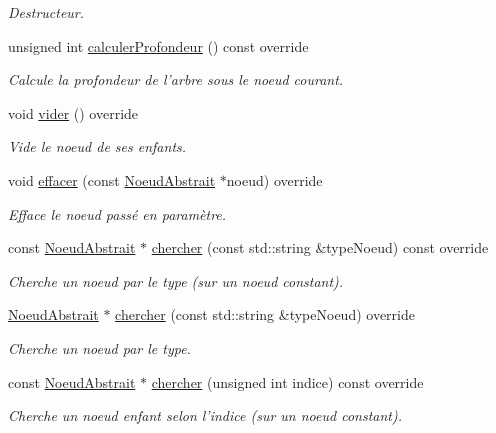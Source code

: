 \begin{DoxyCompactItemize}
\begin{DoxyCompactList}\small\item\em Destructeur. \end{DoxyCompactList}\item 
unsigned int \hyperlink{group__inf2990_ga89492965d116a0ff989ad93114acda57}{calculer\-Profondeur} () const override
\begin{DoxyCompactList}\small\item\em Calcule la profondeur de l'arbre sous le noeud courant. \end{DoxyCompactList}\item 
void \hyperlink{group__inf2990_gaede690fd0ecafe4244479ca4f054a65f}{vider} () override
\begin{DoxyCompactList}\small\item\em Vide le noeud de ses enfants. \end{DoxyCompactList}\item 
void \hyperlink{group__inf2990_gad6e967709392313acafee99a9a05a5a5}{effacer} (const \hyperlink{class_noeud_abstrait}{Noeud\-Abstrait} $\ast$noeud) override
\begin{DoxyCompactList}\small\item\em Efface le noeud passé en paramètre. \end{DoxyCompactList}\item 
const \hyperlink{class_noeud_abstrait}{Noeud\-Abstrait} $\ast$ \hyperlink{group__inf2990_ga54f08be205a89ec9fd9b43bf083b7cbf}{chercher} (const std\-::string \&type\-Noeud) const override
\begin{DoxyCompactList}\small\item\em Cherche un noeud par le type (sur un noeud constant). \end{DoxyCompactList}\item 
\hyperlink{class_noeud_abstrait}{Noeud\-Abstrait} $\ast$ \hyperlink{group__inf2990_gad7f54e2eb26b9ce59fbaedb2d0090f0e}{chercher} (const std\-::string \&type\-Noeud) override
\begin{DoxyCompactList}\small\item\em Cherche un noeud par le type. \end{DoxyCompactList}\item 
const \hyperlink{class_noeud_abstrait}{Noeud\-Abstrait} $\ast$ \hyperlink{group__inf2990_ga18bc4346903226c2fa4370a7b2ef8f4e}{chercher} (unsigned int indice) const override
\begin{DoxyCompactList}\small\item\em Cherche un noeud enfant selon l'indice (sur un noeud constant). \end{DoxyCompactList}\item 

\end{DoxyCompactItemize}
